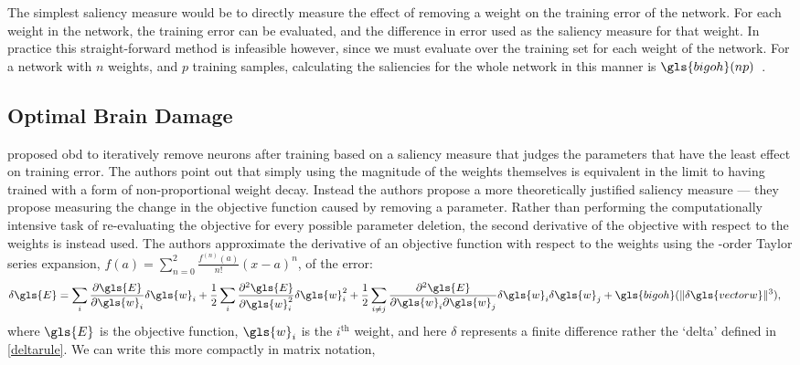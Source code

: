 \documentclass[thesis]{subfiles}
\begin{document}
	The simplest saliency measure would be to directly measure the effect of removing a weight on the training error of the network. For each weight in the network, the training error can be evaluated, and the difference in error used as the saliency measure for that weight. In practice this straight-forward method is infeasible however, since we must evaluate over the training set for each weight of the network. For a network with $n$ weights, and $p$ training samples, calculating the saliencies for the whole network in this manner is $\gls{bigoh}(np)$~\citep{hanson1989comparing}.
	
	\subsection{Optimal Brain Damage}
	\citet{lecun1989optimal} proposed \gls{obd} to iteratively remove neurons after training based on a saliency measure that judges the parameters that have the least effect on training error. The authors point out that simply using the magnitude of the weights themselves is equivalent in the limit to having trained with a form of non-proportional weight decay. Instead the authors propose a more theoretically justified saliency measure --- they propose measuring the change in the objective function caused by removing a parameter. Rather than performing the computationally intensive task of re-evaluating the objective for every possible parameter deletion, the second derivative of the objective with respect to the weights is instead used. The authors approximate the derivative of an objective function with respect to the weights using the -order Taylor series expansion, $f(a) = \sum_{n=0}^{2} \frac{f^{(n)}(a)}{n!} (x - a)^n$, of the error:
    \begin{align}
       \delta \gls{E} &= \sum_i \frac{\partial \gls{E}}{\partial \gls{w}_i} \delta \gls{w}_i + \frac{1}{2} \sum_i \frac{\partial^2 \gls{E}}{\partial \gls{w}_i^2} \delta \gls{w}_i^2 + \frac{1}{2} \sum_{i\neq j} \frac{\partial^2 \gls{E}}{\partial \gls{w}_i \partial \gls{w}_j} \delta \gls{w}_i \delta \gls{w}_j +\gls{bigoh}(\|\delta \gls{vectorw}\|^3),
    \end{align}
    where $\gls{E}$ is the objective function, $\gls{w}_i$ is the $i^{\textrm{th}}$ weight, and here $\delta$ represents a finite difference rather the `delta' defined in \cref{deltarule}. We can write this more compactly in matrix notation,
\end{document}
